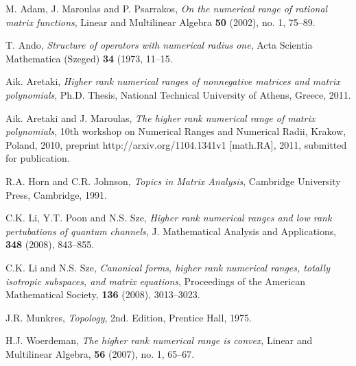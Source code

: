 \documentclass[12pt, reqno]{amsart}
\theoremstyle{definition}
\theoremstyle{remark}
\numberwithin{equation}{section}
\begin{document}

\begin{thebibliography}{99}

 M. Adam, J. Maroulas and P. Psarrakos, \textit{On the numerical range of rational matrix functions}, Linear and Multilinear Algebra
\textbf{50} (2002), no. 1, 75--89.

 T. Ando, \textit{Structure of operators with numerical radius one}, Acta Scientia Mathematica  (Szeged) \textbf{34} (1973, 11--15.

 Aik. Aretaki, \textit{Higher rank numerical ranges of nonnegative matrices and matrix polynomials}, Ph.D. Thesis, National Technical University of Athens, Greece, 2011.

 Aik. Aretaki and J. Maroulas, \textit{The higher rank numerical range of matrix polynomials}, 10th workshop on  Numerical Ranges and
Numerical Radii, Krakow, Poland, 2010, preprint http://arxiv.org/1104.1341v1 [math.RA], 2011, submitted for publication.

 R.A. Horn and C.R. Johnson, \textit{Topics in Matrix Analysis}, Cambridge University Press, Cambridge, 1991.

 C.K. Li, Y.T. Poon and N.S. Sze, \textit{Higher rank numerical ranges and low rank pertubations of quantum channels}, J. Mathematical Analysis and Applications, \textbf{348} (2008), 843--855.

 C.K. Li and N.S. Sze, \textit{Canonical forms, higher rank numerical ranges, totally isotropic subspaces, and matrix equations},
Proceedings of the American Mathematical Society, \textbf{136} (2008), 3013--3023.

 J.R. Munkres, \textit{Topology}, 2nd. Edition, Prentice Hall, 1975.

 H.J. Woerdeman, \textit{The higher rank numerical range is convex}, Linear and Multilinear Algebra, \textbf{56} (2007), no. 1, 65--67.
\end{thebibliography}
\end{document}
